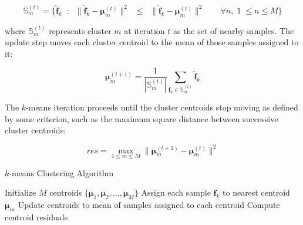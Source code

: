 \begin{equation}
\label{eqn:chap10-kmeans-assign}
\mathbb{S}_{m}^{(t)} = \lbrace \boldsymbol{\hat{f}}_{k} \;\; : \;\; \| \boldsymbol{\hat{f}}_{k} - \boldsymbol{\mu}_{m}^{(t)} \|^{2} \;\; \le \;\; \| \boldsymbol{\hat{f}}_{k} - \boldsymbol{\mu}_{m}^{(t)} \|^{2} \;\;\;\;\;\;\; \forall n, \; 1 \; \le n \le M \rbrace
\end{equation}

\noindent where $\mathbb{S}_{m}^{(t)}$ represents cluster $m$ at iteration $t$ as the set of nearby samples. The update step moves each cluster centroid to the mean of those samples assigned to it:

\begin{equation}
\label{eqn:chap10-kmeans-update}
\boldsymbol{\mu}_{m}^{(t+1)} = \frac{1}{|\mathbb{S}_{m}^{(t)}|} \displaystyle\sum\limits_{\boldsymbol{\hat{f}}_{k} \in \mathbb{S}_{m}^{(t)}} \boldsymbol{\hat{f}}_{k}
\end{equation}

The $k$-means iteration proceeds until the cluster centroids stop moving as defined by some criterion, such as the maximum square distance between successive cluster centroids:

\begin{equation}
\label{eqn:chap10-kmeans-residuals}
res = \max_{1 \le m \le M} \|\boldsymbol{\mu}_{m}^{(t+1)} - \boldsymbol{\mu}_{m}^{(t)}\|^{2}
\end{equation}

\begin{algorithm}[ht!]
\caption{$k$-means Clustering Algorithm}
\label{alg:chap10-kmeans}
\begin{algorithmic}[1]
  \State Initialize $M$ centroids $\lbrace \boldsymbol{\mu}_{1}, \boldsymbol{\mu}_{2}, \dots, \boldsymbol{\mu}_{M} \rbrace$
    \State Assign each sample $\boldsymbol{\hat{f}}_{k}$ to nearest centroid $\boldsymbol{\mu}_{m}$ 
    \State Update centroids to mean of samples assigned to each centroid 
    \State Compute centroid residuals 
  \EndWhile
\end{algorithmic}
\end{algorithm}

